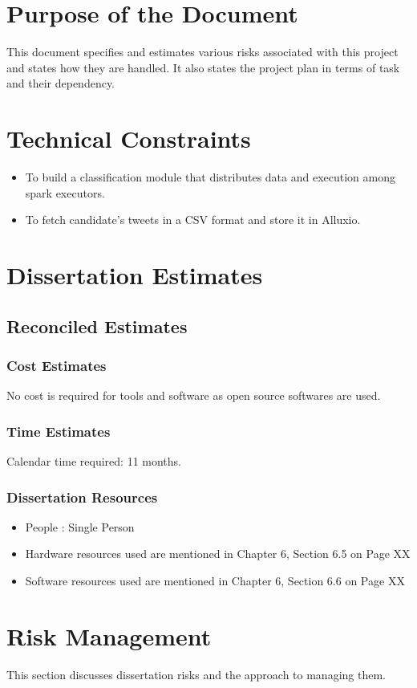 \documentclass[oneside,a4paper,12pt]{pictreport}
\begin{document}
\section{Purpose of the Document}
This document specifies and estimates various risks associated with this project and states how they are handled. It also states the project plan in terms of task and their dependency.

\section{Technical Constraints}
\begin{itemize}
\item To build a classification module that distributes data and execution among spark executors.
\item To fetch candidate's tweets in a CSV format and store it in Alluxio.
\end{itemize}

\section{Dissertation Estimates}
\subsection{Reconciled Estimates}
\subsubsection{Cost Estimates}
No cost is required for tools and software as open source softwares are used.
\subsubsection{Time Estimates}
Calendar time required: 11 months.
\subsubsection{Dissertation Resources}
\begin{itemize}
\item People : Single Person
\item Hardware resources used are mentioned in Chapter 6, Section 6.5 on Page XX
\item Software resources used are mentioned in Chapter 6, Section 6.6 on Page XX
\end{itemize}

\section{Risk Management}
This section discusses dissertation risks and the approach to managing them.
\end{document}
